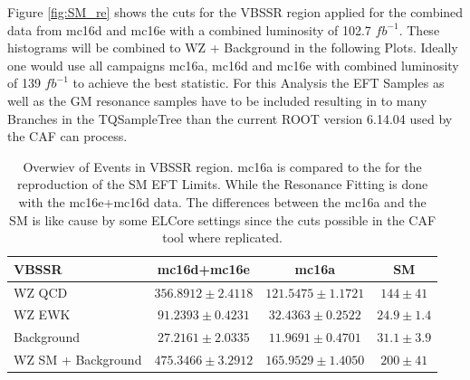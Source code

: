 \documentclass[../Bachelorarbeit.tex]{subfiles}
\begin{document}
Figure \ref*{fig:SM_re} shows the cuts for the VBSSR region applied for the combined data from mc16d and mc16e with a combined luminosity of 102.7 $fb^{-1}$.
These histograms will be combined to WZ + Background in the following Plots.
Ideally one would use all campaigns mc16a, mc16d and mc16e with combined luminosity of 139 $fb^{-1}$ to achieve the best statistic.
For this Analysis the EFT Samples as well as the GM resonance samples have to be included resulting in to many Branches in the TQSampleTree than
the current ROOT version 6.14.04 used by the CAF can process.


\begin{table}
    \centering
    \begin{tabular}{ l c c c }
        \hline
        VBSSR              & mc16d+mc16e           & mc16a                 & SM             \\
        \hline
        WZ QCD             & $356.8912 \pm 2.4118$ & $121.5475 \pm 1.1721$ & $144 \pm 41$   \\
        WZ EWK             & $91.2393 \pm 0.4231$  & $32.4363 \pm 0.2522$  & $24.9 \pm 1.4$ \\
        Background         & $27.2161 \pm 2.0335$  & $11.9691 \pm 0.4701$  & $31.1 \pm 3.9$ \\
        \hline
        WZ SM + Background & $475.3466 \pm 3.2912$ & $165.9529 \pm 1.4050$ & $200 \pm 41$   \\
        \hline
    \end{tabular}
    \caption{Overwiev of Events in VBSSR region. mc16a is compared to the \cite{Sampsonidou.25.11.2021} for the reproduction of the SM EFT Limits.
        While the Resonance Fitting is done with the mc16e+mc16d data. The differences between the mc16a and the SM is like cause by some ELCore settings
        since the cuts possible in the CAF tool where replicated.}
    \label{tab:SM_re}
\end{table}
\end{document}

